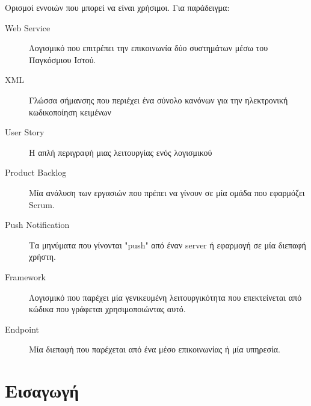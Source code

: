 \documentclass[oneside, 12pt]{book}
\begin{document}
\begin{Definitions}
Ορισμοί εννοιών που μπορεί να είναι χρήσιμοι. Για παράδειγμα:

\begin{description}
\item [Web Service] Λογισμικό που επιτρέπει την επικοινωνία δύο συστημάτων μέσω του Παγκόσμιου Ιστού.
\end{description}

\begin{description}
\item [XML] Γλώσσα σήμανσης που περιέχει ένα σύνολο κανόνων για την ηλεκτρονική κωδικοποίηση κειμένων
\end{description}

\begin{description}
\item [User Story] Η απλή περιγραφή μιας λειτουργίας ενός λογισμικού
\end{description}

\begin{description}
\item [Product Backlog] Μία ανάλυση των εργασιών που πρέπει να γίνουν σε μία ομάδα που εφαρμόζει Scrum.
\end{description}

\begin{description}
\item [Push Notification] Τα μηνύματα που γίνονται "push" από έναν server ή εφαρμογή σε μία διεπαφή χρήστη.
\end{description}

\begin{description}
\item [Framework] Λογισμικό που παρέχει μία γενικευμένη λειτουργικότητα που επεκτείνεται από κώδικα που γράφεται χρησιμοποιώντας αυτό.
\end{description}

\begin{description}
\item [Endpoint] Μία διεπαφή που παρέχεται από ένα μέσο επικοινωνίας ή μία υπηρεσία.
\end{description}

\end{Definitions}

\chapter{Εισαγωγή}
\end{document}

